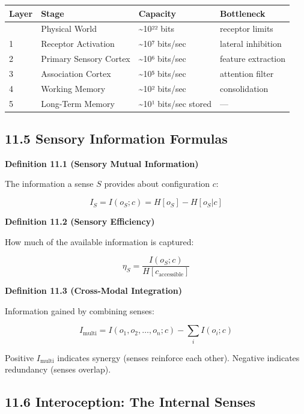 \documentclass[
  11pt,
  letterpaper,
  twoside,
  openany]{book}
\makeatletter
\let\orig@subsection\subsection
\renewcommand{\subsection}{\needspace{6\baselineskip}\orig@subsection}
\makeatother
\begin{document}
\begin{longtable}[]{@{}llll@{}}
\toprule\noalign{}
Layer & Stage & Capacity & Bottleneck \\
\midrule\noalign{}
\endhead
\bottomrule\noalign{}
\endlastfoot
0 & Physical World & \textasciitilde10²² bits & receptor limits \\
1 & Receptor Activation & \textasciitilde10⁷ bits/sec & lateral
inhibition \\
2 & Primary Sensory Cortex & \textasciitilde10⁶ bits/sec & feature
extraction \\
3 & Association Cortex & \textasciitilde10⁵ bits/sec & attention
filter \\
4 & Working Memory & \textasciitilde10² bits/sec & consolidation \\
5 & Long-Term Memory & \textasciitilde10¹ bits/sec stored & --- \\
\end{longtable}

\subsection{11.5 Sensory Information
Formulas}\label{sensory-information-formulas}

\textbf{Definition 11.1 (Sensory Mutual Information)}

The information a sense \(S\) provides about configuration \(c\):

\[I_S = I(o_S; c) = H[o_S] - H[o_S | c]\]

\textbf{Definition 11.2 (Sensory Efficiency)}

How much of the available information is captured:

\[\eta_S = \frac{I(o_S; c)}{H[c_{\text{accessible}}]}\]

\textbf{Definition 11.3 (Cross-Modal Integration)}

Information gained by combining senses:

\[I_{\text{multi}} = I(o_1, o_2, \ldots, o_n; c) - \sum_i I(o_i; c)\]

Positive \(I_{\text{multi}}\) indicates synergy (senses reinforce each
other). Negative indicates redundancy (senses overlap).

\subsection{11.6 Interoception: The Internal
Senses}\label{interoception-the-internal-senses}
\end{document}
